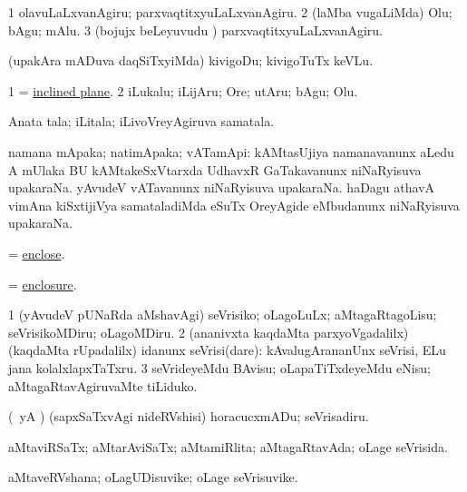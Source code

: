 \noindent
\gl{\akirx}
\bmng
\bnum
\num{1} olavuLaLxvanAgiru; parxvaqtitxyuLaLxvanAgiru. 
\num{2} (laMba \mo vugaLiMda) Olu; bAgu; mAlu. 
\num{3} (bojujx beLeyuvudu \mo) parxvaqtitxyuLaLxvanAgiru. 
\enum
\emng

\noindent
\gl{\nuga}
\bmng
{} (upakAra mADuva daqSiTxyiMda) kivigoDu; kivigoTuTx keVLu. 
\emng
\eentry

\bentry
{}
\gl{\nA}
\bmng
\bnum
\num{1}  = \hyperlink{inclined plane}{inclined plane}. 
\num{2} iLukalu; iLijAru; Ore; utAru; bAgu; Olu. 
\enum
\emng
\eentry

\bentry
{}
\gl{\nA}
\bmng
Anata tala; iLitala; iLivoVreyAgiruva samatala. 
\emng
\eentry

\bentry
{}
\gl{\nA}
\bmng
namana mApaka; natimApaka; vATamApi: 
\banum
{} kAMtasUjiya namanavanunx aLedu A mUlaka BU kAMtakeSxVtarxda UdhavxR GaTakavanunx niNaRyisuva upakaraNa. 
 yAvudeV vATavanunx niNaRyisuva upakaraNa. 
 haDagu athavA vimAna kiSxtijiVya samataladiMda eSuTx OreyAgide eMbudanunx niNaRyisuva upakaraNa. 
\eanum
\emng
\eentry

\bentry
{}
\gl{\sakirx}
\bmng
= \hyperref{kandict_e.pdf}{E}{enclose}{enclose}. 
\emng
\eentry

\bentry
{}
\gl{\nA}
\bmng
= \hyperref{kandict_e.pdf}{E}{enclosure}{enclosure}. 
\emng
\eentry

\bentry
{}
\gl{\sakirx}
\bmng
\bnum
\num{1} (yAvudeV pUNaRda aMshavAgi) seVrisiko; oLagoLuLx; aMtagaRtagoLisu; seVrisikoMDiru; oLagoMDiru. 
\num{2} (ananivxta kaqdaMta parxyoVgadalilx) (kaqdaMta rUpadalilx) idanunx seVrisi(dare):  kAvalugArananUnx seVrisi, ELu jana kolalxlapxTaTxru. 
\num{3} seVrideyeMdu BAvisu; oLapaTiTxdeyeMdu eNisu; aMtagaRtavAgiruvaMte tiLiduko. 
\enum
\emng

\noindent
\gl{\nuga}
\bmng
{} (\AmA\ yA \hA) (sapxSaTxvAgi nideRVshisi) horacucxmADu; seVrisadiru. 
\emng
\eentry

\bentry
{}
\gl{\gu}
\bmng
aMtaviRSaTx; aMtarAviSaTx; aMtamiRlita; aMtagaRtavAda; oLage seVrisida. 
\emng
\eentry

\bentry
{}
\gl{\nA}
\bmng
aMtaveRVshana; oLagUDisuvike; oLage seVrisuvike. 
\emng
\eentry

